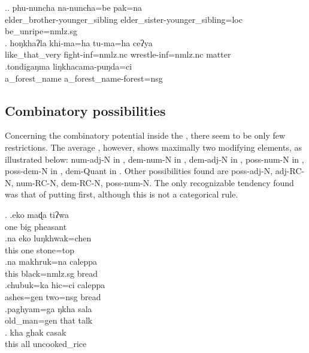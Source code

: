 \ex.\ag. phu-nuncha    na-nuncha=be     pak=na\\
elder\_brother-younger\_sibling elder\_sister-younger\_sibling{\sc =loc} be\_unripe{\sc =nmlz.sg}\\
 
\bg. hoŋkhaʔla khi-ma=ha     tu-ma=ha     ceʔya \\
like\_that\_very fight{\sc -inf=nmlz.nc} wrestle{\sc -inf=nmlz.nc} matter\\
 
 \bg.tondigaŋma liŋkhacama-puŋda=ci\\
  a\_forest\_name a\_forest\_name-forest{\sc =nsg}\\
   
 
\subsection{Combinatory possibilities}

Concerning the combinatory potential inside the , there seem to be only few restrictions. The average , however, shows maximally two modi\-fying elements, as illustrated below: {\sc num-adj-N} in \Next[a], {\sc dem-num-N} in \Next[b], {\sc dem-adj-N} in \Next[c], {\sc poss-num-N} in \Next[d], {\sc poss-dem-N} in \Next[e], {\sc dem-Quant } in \Next[f]. Other possibilities found are {\sc poss-adj-N}, {\sc adj-RC-N}, {\sc num-RC-N}, {\sc dem-RC-N}, {\sc poss-num-N}. The only recognizable tendency found was that of putting  first, although this is not a categorical rule.
 	
 \ex. \ag.eko maɖa tiʔwa\\
 one big pheasant\\
  
 \bg.na   eko luŋkhwak=chen\\
 this one stone{\sc =top}\\
  
  \bg.na   makhruk=na caleppa \\
this black{\sc =nmlz.sg} bread\\
  
  \bg.chubuk=ka    hic=ci     caleppa\\
 ashes{\sc =gen} two{\sc =nsg} bread\\
  
  \bg.paghyam=ga    ŋkha sala\\
 old\_man{\sc =gen} that talk\\
  
 \bg.      kha  ghak casak\\
 this  all uncooked\_rice\\
 
